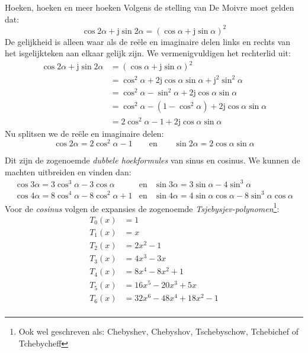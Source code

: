 \documentclass[12pt,fleqn]{article}
\newcommand\imaginaryunit{j}                  %
\newcommand\imunit{\mathrm{\imaginaryunit}}   %
\begin{document}
\begin{infobox}{{Hoeken, hoeken en meer hoeken}}
Volgens de stelling van De Moivre moet gelden dat:
%
\begin{equation}
\cos 2\alpha + \imunit\sin 2\alpha = (\cos \alpha + \imunit\sin\alpha)^2
\end{equation}
%
De gelijkheid is alleen waar als de reële en imaginaire delen links en rechts van het isgelijkteken aan elkaar gelijk zijn. We vermenigvuldigen het rechterlid uit:
%
\begin{equation}
\begin{split}
\cos 2\alpha + \imunit\sin 2\alpha &= (\cos \alpha + \imunit\sin\alpha)^2 \\
 &= \cos^2 \alpha + 2\imunit\cos\alpha\sin\alpha + \imunit^2\sin^2\alpha \\
 &= \cos^2 \alpha - \sin^2\alpha + 2\imunit\cos\alpha\sin\alpha \\
 &= \cos^2 \alpha - (1-\cos^2 \alpha) + 2\imunit\cos\alpha\sin\alpha \\
 &= 2\cos^2 \alpha - 1 + 2\imunit\cos\alpha\sin\alpha
\end{split}
\end{equation}
%
Nu splitsen we de reële en imaginaire delen:
%
\begin{equation}
\cos 2\alpha = 2\cos^2 \alpha - 1 \qquad\text{en}\qquad \sin 2\alpha = 2\cos\alpha\sin\alpha
\end{equation}

Dit zijn de zogenoemde \textsl{dubbele hoekformules} van sinus en cosinus. We kunnen de
machten uitbreiden en vinden dan:
%
\begin{equation}
\begin{array}{lll}
\cos 3\alpha = 3\cos^3\alpha - 3\cos\alpha &\text{en} &\sin 3\alpha = 3\sin\alpha - 4\sin^3 \alpha\\
\cos 4\alpha = 8\cos^4 \alpha - 8\cos^2 \alpha + 1 &\text{en} &\sin 4\alpha = 4 \sin\alpha\cos\alpha - 8\sin^3\alpha\cos\alpha
\end{array}
\end{equation}
%
Voor de \textsl{cosinus} volgen de expansies de zogenoemde \textsl{Tsjebysjev-polynomen}\footnote{Ook wel geschreven als: Chebyshev, Chebyshov, Tschebyschow, Tchebichef of Tchebycheff}:
%
\begin{equation}
\begin{split}
T_0(x) &= 1 \\
T_1(x) &= x \\
T_2(x) &= 2x^2 - 1 \\
T_3(x) &= 4x^3 - 3x \\
T_4(x) &= 8x^4 - 8x^2 + 1 \\
T_5(x) &= 16x^5 - 20x^3 + 5x \\
T_6(x) &= 32x^6 - 48x^4 + 18x^2 - 1 \\
\end{split}
\end{equation}


\end{infobox}
\end{document}
